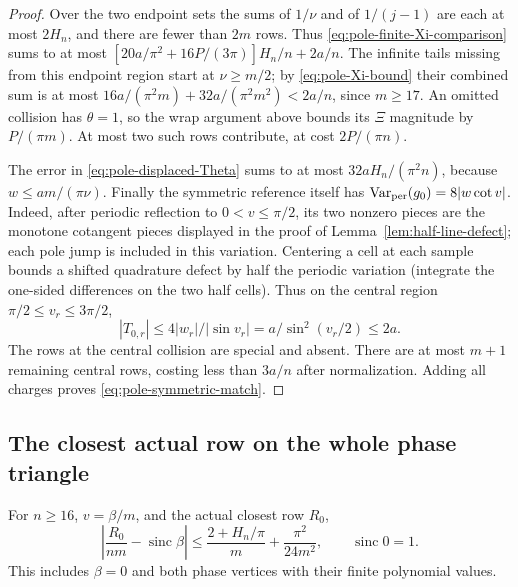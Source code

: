 \begin{proof}
Over the two endpoint sets the sums of $1/\nu$ and of $1/(j-1)$
are each at most $2H_n$, and there are fewer than $2m$ rows.
Thus \eqref{eq:pole-finite-Xi-comparison} sums to at most
$[20a/\pi^2+16P/(3\pi)]H_n/n+2a/n$.
The infinite tails missing from this endpoint region start at
$\nu\geq m/2$; by \eqref{eq:pole-Xi-bound} their combined sum is
at most $16a/(\pi^2m)+32a/(\pi^2m^2)<2a/n$, since $m\geq17$.
An omitted collision has $\theta=1$, so the wrap argument above
bounds its $\Xi$ magnitude by $P/(\pi m)$.
At most two such rows contribute, at cost $2P/(\pi n)$.

The error in \eqref{eq:pole-displaced-Theta} sums to at most
$32aH_n/(\pi^2n)$, because $w\leq am/(\pi\nu)$.
Finally the symmetric reference itself has
$\operatorname{Var}_{\rm per}(g_0)=8|w\cot v|$.
Indeed, after periodic reflection to $0<v\leq\pi/2$, its two
nonzero pieces are the monotone cotangent pieces displayed in the proof
of Lemma~\ref{lem:half-line-defect}; each pole jump is included in
this variation.  Centering a cell at each sample bounds a shifted
quadrature defect by half the periodic variation (integrate the
one-sided differences on the two half cells).  Thus on the central
region $\pi/2\leq v_r\leq3\pi/2$,
\[
 |T_{0,r}|\leq4|w_r|/|\sin v_r|
       =a/\sin^2(v_r/2)\leq2a.
\]
The rows at the central collision are special and absent.  There are
at most $m+1$ remaining central rows, costing less than $3a/n$
after normalization.  Adding all charges proves
\eqref{eq:pole-symmetric-match}.
\end{proof}

\subsection{The closest actual row on the whole phase triangle}

\begin{lemma}\label{lem:closest-row-global}
For $n\geq16$, $v=\beta/m$, and the actual closest row $R_0$,
\begin{equation}\label{eq:pole-closest-row-global}
 \left|\frac{R_0}{nm}-\operatorname{sinc}\beta\right|
       \leq\frac{2+H_n/\pi}{m}+\frac{\pi^2}{24m^2},
 \qquad \operatorname{sinc}0=1.
\end{equation}
This includes $\beta=0$ and both phase vertices with their finite
polynomial values.
\end{lemma}

